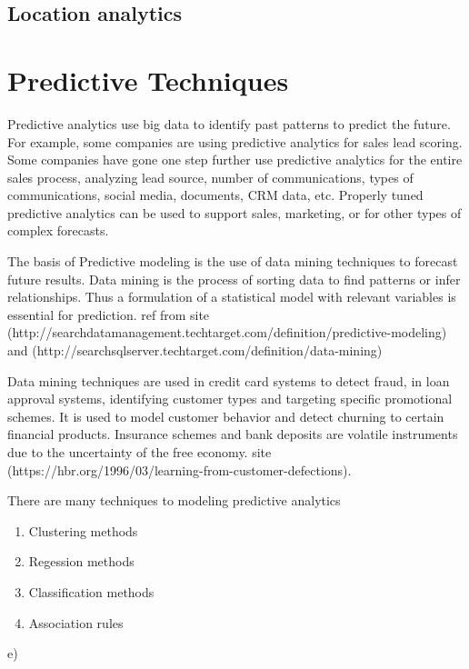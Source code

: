 \section{Location analytics}



%
%
%
%

\setlength{\footskip}{8mm}

\chapter{Predictive Techniques} 
\label{predictive-techniques}

Predictive analytics use big data to identify past patterns to predict the future. For example, some companies are using predictive analytics for sales lead scoring. Some companies have gone one step further use predictive analytics for the entire sales process, analyzing lead source, number of communications, types of communications, social media, documents, CRM data, etc. Properly tuned predictive analytics can be used to support sales, marketing, or for other types of complex forecasts.


The basis of Predictive modeling is the use of data mining techniques to forecast future results. Data mining is the process of sorting data to find patterns or infer relationships.
Thus a formulation of a statistical model with relevant variables is essential for prediction. 
ref from site (http://searchdatamanagement.techtarget.com/definition/predictive-modeling) and (http://searchsqlserver.techtarget.com/definition/data-mining)

Data mining techniques are used in credit card systems to detect fraud, in loan approval systems, identifying customer types and targeting specific promotional schemes. It is used to model customer behavior and detect churning to certain financial products. Insurance schemes and bank deposits are volatile instruments due to the uncertainty of the free economy. site (https://hbr.org/1996/03/learning-from-customer-defections).


There are many techniques to modeling predictive analytics 


\begin{enumerate}
	\item Clustering methods
	\item Regession methods
	\item Classification methods
	\item Association rules
\end{enumerate}e)

